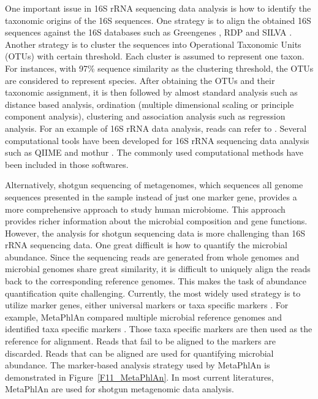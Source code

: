 One important issue in 16S rRNA sequencing data analysis is how to identify the taxonomic origins of the 16S sequences. One strategy  is to align the obtained 16S sequences against the 16S databases such as Greengenes \citep{DeSantis:2006ii}, RDP \citep{Cole:2014jw} and SILVA \citep{Quast:2013hk}. Another strategy is to cluster the sequences into Operational Taxonomic Units (OTUs) with certain threshold. Each cluster is assumed to represent one taxon. For instances, with 97\% sequence similarity as the clustering threshold, the OTUs are considered to represent species.  After obtaining the OTUs and their taxonomic assignment, it is then followed by almost standard analysis such as distance based analysis, ordination (multiple dimensional scaling or principle component analysis), clustering and association analysis such as regression analysis. For an example of 16S rRNA data analysis, reads can refer to \citet{wu2011linking}. Several computational tools have been developed for 16S rRNA sequencing data analysis such as QIIME \citep{Caporaso:2010jf} and mothur \citep{Schloss:2009do}. The commonly used computational methods have been included in those softwares.


Alternatively, shotgun sequencing of metagenomes, which sequences all genome sequences presented in the sample instead of just one marker gene, provides a more comprehensive approach to study human microbiome. This approach provides richer information about the microbial composition and gene functions. However, the analysis for shotgun sequencing data is more challenging than 16S rRNA sequencing data. One great difficult is how to quantify the microbial abundance. Since the sequencing reads are generated from whole genomes and microbial genomes share great similarity, it is difficult to uniquely align the reads back to the corresponding reference genomes. This makes the task of abundance quantification quite challenging. Currently, the most widely used strategy is to utilize  marker genes, either universal  markers \citep{Sunagawa:2013if} or taxa specific markers \citep{segata2012metagenomic}. For example, MetaPhlAn compared multiple microbial reference genomes and identified taxa specific markers \citep{segata2012metagenomic}. Those taxa specific markers are then used as the reference for alignment. Reads that fail to be aligned to the markers are discarded. Reads that can be aligned are used for quantifying microbial abundance. The marker-based analysis strategy used by MetaPhlAn is demonstrated in Figure~\ref{F11_MetaPhlAn}. In most current literatures, MetaPhlAn are used for shotgun metagenomic data analysis.


